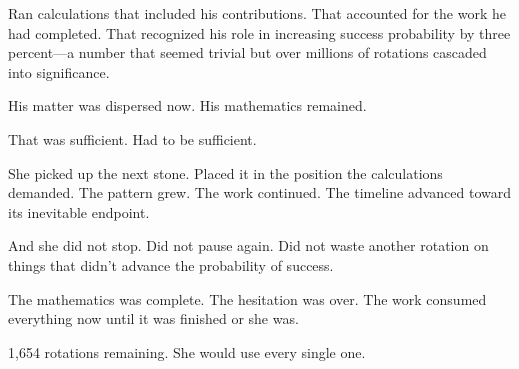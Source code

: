 Ran calculations that included his contributions. That accounted for the work he had completed. That recognized his role in increasing success probability by three percent—a number that seemed trivial but over millions of rotations cascaded into significance.

His matter was dispersed now. His mathematics remained.

That was sufficient. Had to be sufficient.

She picked up the next stone. Placed it in the position the calculations demanded. The pattern grew. The work continued. The timeline advanced toward its inevitable endpoint.

And she did not stop. Did not pause again. Did not waste another rotation on things that didn't advance the probability of success.

The mathematics was complete. The hesitation was over. The work consumed everything now until it was finished or she was.

1,654 rotations remaining. She would use every single one.

